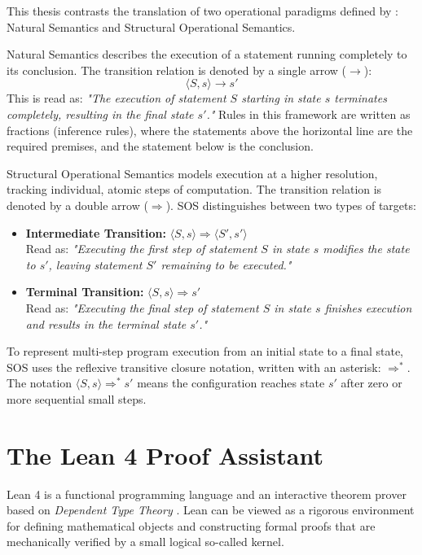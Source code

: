 This thesis contrasts the translation of two operational paradigms defined by \citet{nielson_semantics_2007}: Natural Semantics and Structural Operational Semantics.

Natural Semantics describes the execution of a statement running completely to its conclusion. The transition relation is denoted by a single arrow (\(\to\)):
\[
\langle S, s \rangle \to s'
\]
This is read as: \emph{"The execution of statement $S$ starting in state $s$ terminates completely, resulting in the final state $s'$."} Rules in this framework are written as fractions (inference rules), where the statements above the horizontal line are the required premises, and the statement below is the conclusion.

Structural Operational Semantics models execution at a higher resolution, tracking individual, atomic steps of computation. The transition relation is denoted by a double arrow (\(\Rightarrow\)). SOS distinguishes between two types of targets:
\begin{itemize}
    \item \textbf{Intermediate Transition:} $\langle S, s \rangle \Rightarrow \langle S', s' \rangle$ \\
    Read as: \emph{"Executing the first step of statement $S$ in state $s$ modifies the state to $s'$, leaving statement $S'$ remaining to be executed."}
    \item \textbf{Terminal Transition:} $\langle S, s \rangle \Rightarrow s'$ \\
    Read as: \emph{"Executing the final step of statement $S$ in state $s$ finishes execution and results in the terminal state $s'$."}
\end{itemize}
To represent multi-step program execution from an initial state to a final state, SOS uses the reflexive transitive closure notation, written with an asterisk: \(\Rightarrow^*\). The notation \(\langle S, s \rangle \Rightarrow^* s'\) means the configuration reaches state $s'$ after zero or more sequential small steps.


%
%
%
\section{The Lean 4 Proof Assistant}
\label{background:sec:lean_4}
Lean 4 is a functional programming language and an interactive theorem prover
based on \textit{Dependent Type Theory} \citep{theorem_proving_2026}.
Lean can be viewed as a rigorous environment for defining mathematical objects
and constructing formal proofs that are mechanically verified by a small logical so-called kernel.

